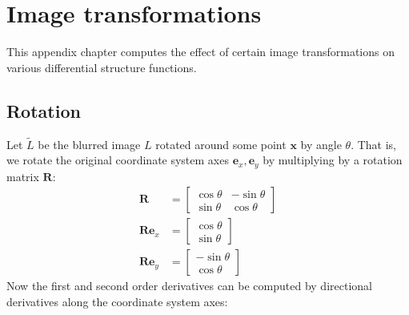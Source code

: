 \documentclass[thesis.tex]{subfiles}
\begin{document}
\appendix
\chapter{Image transformations} \label{apx:image_transformations}

This appendix chapter computes the effect of certain image transformations on various differential structure functions.

\section{Rotation} \label{apx:rotation}

Let $\widetilde{L}$ be the blurred image $L$ rotated around some point $\mathbf{x}$ by angle $\theta$. That is, we rotate the original coordinate system axes $\mathbf{e}_x, \mathbf{e}_y$ by multiplying by a rotation matrix $\mathbf{R}$:
%
\begin{align*}
\mathbf{R} &= \begin{bmatrix}
\cos \theta & -\sin \theta \\
\sin \theta & \cos \theta
\end{bmatrix} \\
\mathbf{Re}_x &= \begin{bmatrix}
\cos \theta \\ \sin \theta
\end{bmatrix} \\
\mathbf{Re}_y &= \begin{bmatrix}
-\sin \theta \\ \cos \theta
\end{bmatrix}
\end{align*}
%
Now the first and second order derivatives can be computed by directional derivatives along the coordinate system axes:
%
\end{document}
